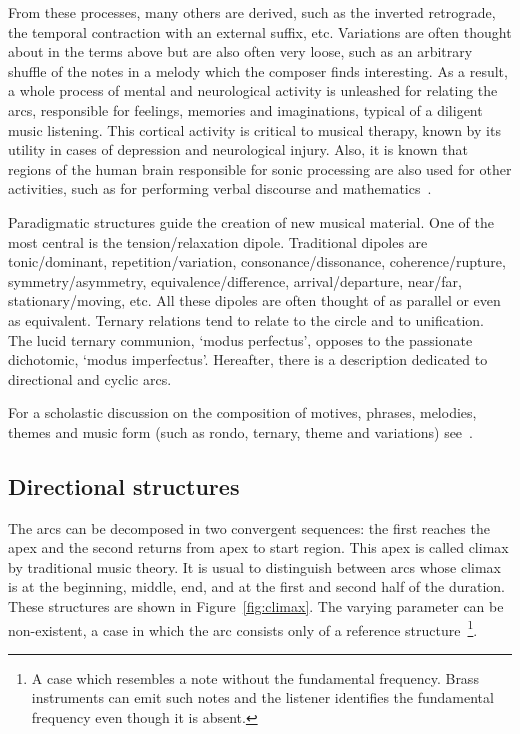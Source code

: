 From these processes, many others are derived, such as the inverted retrograde, the temporal contraction with an external suffix, etc. Variations are often thought about in the terms above but are also often very loose, such as an arbitrary shuffle of the notes in a melody which the composer finds interesting. As a result, a whole process of mental and neurological activity is unleashed for relating the arcs, responsible for feelings, memories and imaginations, typical of a diligent music listening. This cortical activity is critical to
musical therapy, known by its utility in cases of depression and neurological injury. Also, it is known that regions of the human brain responsible for sonic processing are also used for other activities, such as for performing verbal discourse and mathematics~\cite{Sacks,Roederer}.

Paradigmatic structures guide the creation of new musical material.
One of the most central is the tension/relaxation dipole. Traditional dipoles are tonic/dominant, repetition/variation,
consonance/dissonance, coherence/rupture, symmetry/asymmetry,
equivalence/difference, arrival/departure, near/far, stationary/moving,
etc. All these dipoles are often thought of as parallel or even as equivalent. Ternary relations tend to relate to the circle and to unification. The
lucid ternary communion, `modus perfectus', opposes to the passionate
dichotomic, `modus imperfectus'. Hereafter, there is a description dedicated to
directional and cyclic arcs.

For a scholastic discussion on the composition of motives, phrases, melodies, themes and music form (such as rondo, ternary, theme and variations) see~\cite{Schoenberg}.

\subsection{Directional structures}\label{subsec:dir}
The arcs can be decomposed in two convergent sequences: the first reaches the apex and the second returns from apex to start region.
This apex is called climax by traditional music theory. It is
usual to distinguish between arcs whose climax is at the beginning, middle, end,
and at the first and second half of the duration. These structures are
shown in Figure~\ref{fig:climax}. The varying parameter can be non-existent, a case in which
the arc consists only of a reference structure~\cite{Schoenberg}\footnote{A case which resembles a note without the fundamental frequency. Brass instruments can emit such notes and the listener identifies the fundamental frequency even though it is absent.}.

